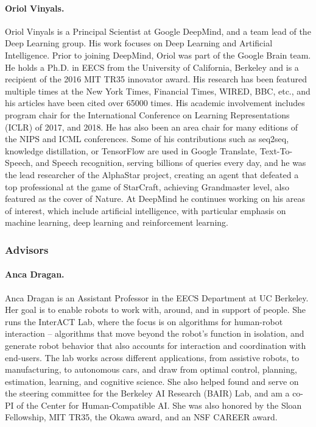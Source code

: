 \paragraph{Oriol Vinyals.} Oriol Vinyals is a Principal Scientist at Google DeepMind, and a team lead of the Deep Learning group. His work focuses on Deep Learning and Artificial Intelligence. Prior to joining DeepMind, Oriol was part of the Google Brain team. He holds a Ph.D. in EECS from the University of California, Berkeley and is a recipient of the 2016 MIT TR35 innovator award. His research has been featured multiple times at the New York Times, Financial Times, WIRED, BBC, etc., and his articles have been cited over 65000 times. His academic involvement includes program chair for the International Conference on Learning Representations (ICLR) of 2017, and 2018. He has also been an area chair for many editions of the NIPS and ICML conferences. Some of his contributions such as seq2seq, knowledge distillation, or TensorFlow are used in Google Translate, Text-To-Speech, and Speech recognition, serving billions of queries every day, and he was the lead researcher of the AlphaStar project, creating an agent that defeated a top professional at the game of StarCraft, achieving Grandmaster level, also featured as the cover of Nature. At DeepMind he continues working on his areas of interest, which include artificial intelligence, with particular emphasis on machine learning, deep learning and reinforcement learning.

\subsubsection{Advisors}
\paragraph{Anca Dragan.} Anca Dragan is an Assistant Professor in the EECS Department at UC Berkeley. Her goal is to enable robots to work with, around, and in support of people. She runs the InterACT Lab, where the focus is on algorithms for human-robot interaction -- algorithms that move beyond the robot's function in isolation, and generate robot behavior that also accounts for interaction and coordination with end-users. The lab works across different applications, from assistive robots, to manufacturing, to autonomous cars, and draw from optimal control, planning, estimation, learning, and cognitive science. She also helped found and serve on the steering committee for the Berkeley AI Research (BAIR) Lab, and am a co-PI of the Center for Human-Compatible AI. She was also honored by the Sloan Fellowship, MIT TR35, the Okawa award, and an NSF CAREER award.

